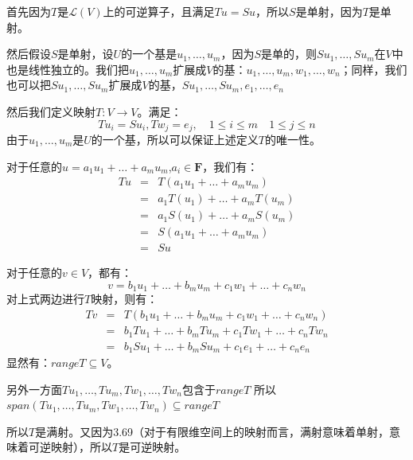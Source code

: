 \documentclass[10pt,a4paper,UTF8]{article}
\begin{document}
\begin{answer}
首先因为\(T\)是\(\mathcal{L}(V)\)上的可逆算子，且满足\(Tu = Su\)，所以\(S\)是单射，因为\(T\)是单射。


然后假设\(S\)是单射，设\(U\)的一个基是\(u_{1},\ldots ,u_{m}\)，因为\(S\)是单的，则\(Su_{1},\ldots ,Su_{m}\)在\(V\)中也是线性独立的。我们把\(u_{1},\ldots ,u_{m}\)扩展成\(V\)的基：\(u_{1},\ldots ,u_{m},w_{1},\ldots ,w_{n}\)；同样，我们也可以把\(Su_{1},\ldots ,Su_{m}\)扩展成\(V\)的基，\(Su_{1},\ldots ,Su_{m},e_{1},\ldots ,e_{n}\)

然后我们定义映射\(T:V\rightarrow V\)。满足：
\begin{equation}
\label{eq:1}
Tu_{i} = Su_{i},Tw_{j} = e_{j}, \quad 1 \leq i \leq m \quad 1 \leq j \leq n
\end{equation}
由于\(u_{1},\ldots ,u_{m}\)是\(U\)的一个基，所以可以保证上述定义\(T\)的唯一性。

对于任意的\(u=a_{1}u_{1} + \ldots + a_{m}u_{m}\),\(a_{i}\in \mathbf{F}\)，我们有：
\begin{eqnarray*}
Tu&=&T(a_{1}u_{1} + \ldots + a_{m}u_{m}) \\
&=&a_{1}T(u_{1}) + \ldots + a_{m}T(u_{m}) \\
&=&a_{1}S(u_{1}) + \ldots + a_{m} S(u_{m}) \\
&=&S(a_{1}u_{1} + \ldots + a_{m}u_{m}) \\
&=&Su
\end{eqnarray*}

对于任意的\(v\in V\)，都有：
\begin{equation}
\label{eq:2}
v = b_{1}u_{1} + \ldots + b_{m}u_{m} + c_{1}w_{1} + \ldots + c_{n}w_{n}
\end{equation}
对上式两边进行\(T\)映射，则有：
\begin{eqnarray*}
Tv&=&T( b_{1}u_{1} + \ldots + b_{m}u_{m} + c_{1}w_{1} + \ldots + c_{n}w_{n}) \\
&=&b_{1}Tu_{1} + \ldots + b_{m}Tu_{m} + c_{1}Tw_{1} + \ldots + c_{n}Tw_{n} \\
&=&b_{1}Su_{1} + \ldots + b_{m}Su_{m} + c_{1}e_{1} + \ldots + c_{n}e_{n}
\end{eqnarray*}
显然有：\(rangeT \subseteq V\)。

另外一方面\(Tu_{1},\ldots ,Tu_{m},Tw_{1},\ldots ,Tw_{n}\)包含于\(rangeT\) 所以 
\(span(Tu_{1},\ldots ,Tu_{m},Tw_{1},\ldots ,Tw_{n})\subseteq rangeT\)

所以\(T\)是满射。又因为3.69（对于有限维空间上的映射而言，满射意味着单射，意味着可逆映射），所以\(T\)是可逆映射。
\end{answer}
\end{document}
